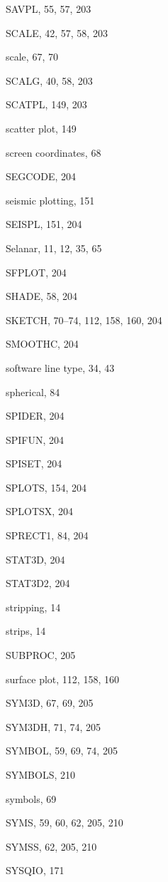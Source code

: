 \begin{theindex}
  \indexspace

  \item SAVPL, 55, 57, 203
  \item SCALE, 42, 57, 58, 203
  \item scale, 67, 70
  \item SCALG, 40, 58, 203
  \item SCATPL, 149, 203
  \item scatter plot, 149
  \item screen coordinates, 68
  \item SEGCODE, 204
  \item seismic plotting, 151
  \item SEISPL, 151, 204
  \item Selanar, 11, 12, 35, 65
  \item SFPLOT, 204
  \item SHADE, 58, 204
  \item SKETCH, 70--74, 112, 158, 160, 204
  \item SMOOTHC, 204
  \item software line type, 34, 43
  \item spherical, 84
  \item SPIDER, 204
  \item SPIFUN, 204
  \item SPISET, 204
  \item SPLOTS, 154, 204
  \item SPLOTSX, 204
  \item SPRECT1, 84, 204
  \item STAT3D, 204
  \item STAT3D2, 204
  \item stripping, 14
  \item strips, 14
  \item SUBPROC, 205
  \item surface plot, 112, 158, 160
  \item SYM3D, 67, 69, 205
  \item SYM3DH, 71, 74, 205
  \item SYMBOL, 59, 69, 74, 205
  \item SYMBOLS, 210
  \item symbols, 69
  \item SYMS, 59, 60, 62, 205, 210
  \item SYMSS, 62, 205, 210
  \item SYSQIO, 171

  \indexspace


\end{theindex}
